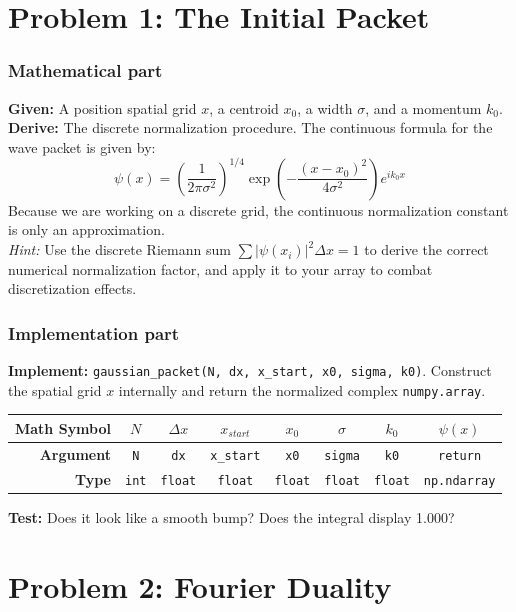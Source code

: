 \documentclass[11pt]{article}
\begin{document}
\section*{Problem 1: The Initial Packet}

\subsubsection*{Mathematical part}
\textbf{Given:} A position spatial grid $x$, a centroid $x_0$, a width $\sigma$, and a momentum $k_0$. \\
\textbf{Derive:} The discrete normalization procedure. The continuous formula for the wave packet is given by:
$$
\psi(x) = \left(\frac{1}{2\pi \sigma^2}\right)^{1/4} \exp\left(-\frac{(x-x_0)^2}{4\sigma^2}\right) e^{i k_0 x}
$$
Because we are working on a discrete grid, the continuous normalization constant is only an approximation. \\
\textit{Hint:} Use the discrete Riemann sum $\sum |\psi(x_i)|^2 \Delta x = 1$ to derive the correct numerical normalization factor, and apply it to your array to combat discretization effects.

\subsubsection*{Implementation part}
\textbf{Implement:} \lstinline|gaussian_packet(N, dx, x_start, x0, sigma, k0)|. Construct the spatial grid $x$ internally and return the normalized complex \lstinline|numpy.array|.
\begin{center}
\renewcommand{\arraystretch}{2.0}
\begin{tabular}{r | c | c | c | c | c | c | c}
\toprule
\textbf{Math Symbol} & $N$ & $\Delta x$ & $x_{start}$ & $x_0$ & $\sigma$ & $k_0$ & $\psi(x)$ \\
\midrule
\textbf{Argument} & \lstinline|N| & \lstinline|dx| & \lstinline|x_start| & \lstinline|x0| & \lstinline|sigma| & \lstinline|k0| & \lstinline|return| \\
\midrule
\textbf{Type} & \lstinline|int| & \lstinline|float| & \lstinline|float| & \lstinline|float| & \lstinline|float| & \lstinline|float| & \lstinline|np.ndarray| \\
\bottomrule
\end{tabular}
\end{center}
\textbf{Test:} Does it look like a smooth bump? Does the integral display 1.000?


\section*{Problem 2: Fourier Duality}
\end{document}
